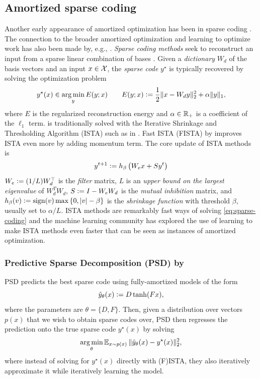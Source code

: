 \documentclass[twoside,11pt]{article}
\newcommand{\eg}{e.g.\xspace}
\begin{document}
\subsection{Amortized sparse coding}
\label{sec:apps:lista}
Another early appearance of amortized optimization has been in
sparse coding \citep{kavukcuoglu2010fast,gregor2010learning}.
The connection to the broader amortized optimization and
learning to optimize work has also been made by,
\eg, \citet{chen2021learning}.
\emph{Sparse coding methods} seek to reconstruct an input
from a sparse linear combination of bases
\citep{olshausen1996emergence,chen2001atomic,donoho2003optimally}.
Given a \emph{dictionary} $W_d$ of the basis vectors
and an input $x\in{\mathcal{X}}$, the \emph{sparse code} $y^\star$ is
typically recovered by solving the optimization problem
\begin{equation}
  y^\star(x) \in \operatorname*{arg\,min}_y E(y; x) \qquad
  E(y; x)\vcentcolon= \frac{1}{2}\|x-W_dy\|_2^2 + \alpha\|y\|_1,
  \label{eq:sparse-coding}
\end{equation}
where $E$ is the regularized reconstruction energy
and $\alpha\in\mathbb{R}_+$ is a coefficient of the $\ell_1$ term.
 is traditionally solved
with the Iterative Shrinkage and Thresholding Algorithm (ISTA)
such as in \citet{daubechies2004iterative}.
Fast ISTA (FISTA) by \citet{beck2009fast} improves ISTA even more
by adding momentum term.
The core update of ISTA methods is
\begin{equation}
  y^{t+1}\vcentcolon= h_\beta\left(W_ex + Sy^t\right)
  \label{eq:ista}
\end{equation}
$W_e\vcentcolon= (1/L)W_d^\top$ is the \emph{filter} matrix,
$L$ is an \emph{upper bound on the largest eigenvalue} of $W_d^T W_d$,
$S\vcentcolon= I-W_eW_d$ is the \emph{mutual inhibition} matrix,
and
$h_\beta(v)\vcentcolon=\operatorname{sign}(v)\max\left\{0, |v|-\beta\right\}$
is the \emph{shrinkage function} with threshold $\beta$, usually
set to $\alpha/L$.
ISTA methods are remarkably fast ways of solving
\cref{eq:sparse-coding} and
the machine learning community has explored the use
of learning to make ISTA methods even faster
that can be seen as instances of amortized optimization.

\subsubsection{Predictive Sparse Decomposition (PSD) by \citet{kavukcuoglu2010fast}}
PSD predicts the best sparse code using fully-amortized models
of the form
\begin{equation}
  \hat y_\theta(x) \vcentcolon= D\tanh(Fx),
  \label{eq:fast-ista}
\end{equation}
where the parameters are $\theta=\{D,F\}$.
Then, given a distribution over vectors $p(x)$
that we wish to obtain sparse codes over,
PSD then regresses the prediction onto the true sparse code $y^\star(x)$
by solving
\begin{equation}
  \operatorname*{arg\,min}_\theta \operatorname{\mathbb{E}}_{x\sim p(x)} \|\hat y_\theta(x) - y^\star(x)\|_2^2,
  \label{eq:psd-loss}
\end{equation}
where instead of solving for $y^\star(x)$ directly
with (F)ISTA, they also iteratively approximate it while
iteratively learning the model.
\end{document}
